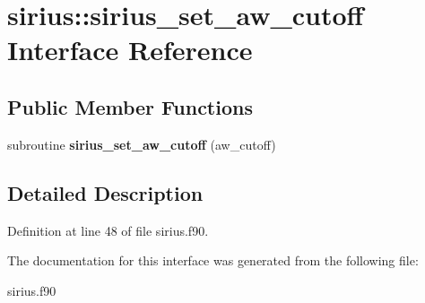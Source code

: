 \hypertarget{interfacesirius_1_1sirius__set__aw__cutoff}{}\section{sirius\+:\+:sirius\+\_\+set\+\_\+aw\+\_\+cutoff Interface Reference}
\label{interfacesirius_1_1sirius__set__aw__cutoff}
\subsection*{Public Member Functions}
\begin{DoxyCompactItemize}
\item 
\hypertarget{interfacesirius_1_1sirius__set__aw__cutoff_a78dc96bb9038f39c885c317da6f05599}{}subroutine {\bfseries sirius\+\_\+set\+\_\+aw\+\_\+cutoff} (aw\+\_\+cutoff)\label{interfacesirius_1_1sirius__set__aw__cutoff_a78dc96bb9038f39c885c317da6f05599}

\end{DoxyCompactItemize}


\subsection{Detailed Description}


Definition at line 48 of file sirius.\+f90.



The documentation for this interface was generated from the following file\+:\begin{DoxyCompactItemize}
\item 
sirius.\+f90\end{DoxyCompactItemize}
